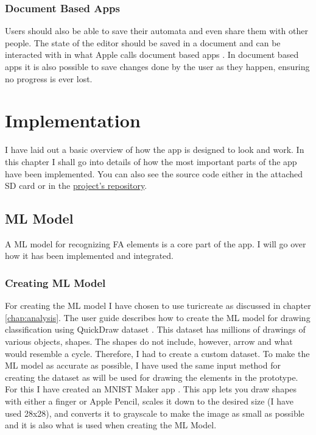 \subsection{Document Based Apps}

Users should also be able to save their automata and even share them with other people. The state of the editor should be saved in a document and can be interacted with in what Apple calls document based apps \cite{document-based}. In document based apps it is also possible to save changes done by the user as they happen, ensuring no progress is ever lost.

\chapter{Implementation}
\label{chap:implementation}

I have laid out a basic overview of how the app is designed to look and work. In this chapter I shall go into details of how the most important parts of the app have been implemented. You can also see the source code either in the attached SD card or in the \href{https://github.com/fortmarek/automata-editor}{project's repository}.

\section{ML Model}

A ML model for recognizing FA elements is a core part of the app. I will go over how it has been implemented and integrated.

\subsection{Creating ML Model}

For creating the ML model I have chosen to use turicreate \cite{turicreate} as discussed in chapter \ref{chap:analysis}. The user guide \cite{drawing-classification} describes how to create the ML model for drawing classification using QuickDraw dataset \cite{quickdraw}. This dataset has millions of drawings of various objects, shapes. The shapes do not include, however, arrow and what would resemble a cycle. Therefore, I had to create a custom dataset. To make the ML model as accurate as possible, I have used the same input method for creating the dataset as will be used for drawing the elements in the prototype. For this I have created an MNIST Maker app \cite{mnist-maker}. This app lets you draw shapes with either a finger or Apple Pencil, scales it down to the desired size (I have used 28x28), and converts it to grayscale to make the image as small as possible and it is also what is used when creating the ML Model.

